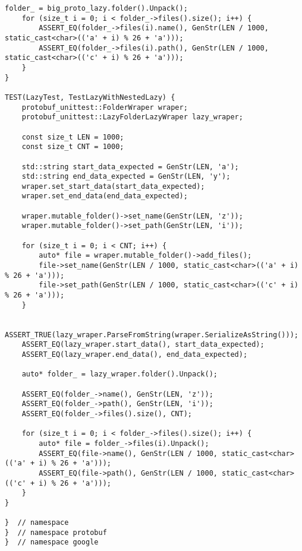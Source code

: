 \begin{lstlisting}[style=CodeListing, label=sec_testing:code:tests, caption={Реализация тестов с помощью фреймворка Google Test}]
    folder_ = big_proto_lazy.folder().Unpack();
    for (size_t i = 0; i < folder_->files().size(); i++) {
        ASSERT_EQ(folder_->files(i).name(), GenStr(LEN / 1000, static_cast<char>(('a' + i) % 26 + 'a')));
        ASSERT_EQ(folder_->files(i).path(), GenStr(LEN / 1000, static_cast<char>(('c' + i) % 26 + 'a')));
    }
}

TEST(LazyTest, TestLazyWithNestedLazy) {
    protobuf_unittest::FolderWraper wraper;
    protobuf_unittest::LazyFolderLazyWraper lazy_wraper;

    const size_t LEN = 1000;
    const size_t CNT = 1000;

    std::string start_data_expected = GenStr(LEN, 'a');
    std::string end_data_expected = GenStr(LEN, 'y');
    wraper.set_start_data(start_data_expected);
    wraper.set_end_data(end_data_expected);

    wraper.mutable_folder()->set_name(GenStr(LEN, 'z'));
    wraper.mutable_folder()->set_path(GenStr(LEN, 'i'));

    for (size_t i = 0; i < CNT; i++) {
        auto* file = wraper.mutable_folder()->add_files();
        file->set_name(GenStr(LEN / 1000, static_cast<char>(('a' + i) % 26 + 'a')));
        file->set_path(GenStr(LEN / 1000, static_cast<char>(('c' + i) % 26 + 'a')));
    }

    ASSERT_TRUE(lazy_wraper.ParseFromString(wraper.SerializeAsString()));
    ASSERT_EQ(lazy_wraper.start_data(), start_data_expected);
    ASSERT_EQ(lazy_wraper.end_data(), end_data_expected);

    auto* folder_ = lazy_wraper.folder().Unpack();

    ASSERT_EQ(folder_->name(), GenStr(LEN, 'z'));
    ASSERT_EQ(folder_->path(), GenStr(LEN, 'i'));
    ASSERT_EQ(folder_->files().size(), CNT);

    for (size_t i = 0; i < folder_->files().size(); i++) {
        auto* file = folder_->files(i).Unpack();
        ASSERT_EQ(file->name(), GenStr(LEN / 1000, static_cast<char>(('a' + i) % 26 + 'a')));
        ASSERT_EQ(file->path(), GenStr(LEN / 1000, static_cast<char>(('c' + i) % 26 + 'a')));
    }
}

}  // namespace
}  // namespace protobuf
}  // namespace google
\end{lstlisting}

